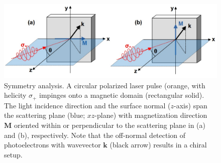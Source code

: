 \documentclass[prl,twocolumn,floatfix]{revtex4-2}
\renewcommand{\vec}[1]{\boldsymbol{#1}}
\newcommand{\rework}[1]{{\color{blue}{#1}}}
\begin{document}
\begin{figure}
    \centering
    \includegraphics[width = \columnwidth]{symmetry}
    \caption{Symmetry analysis. A circular polarized laser pulse (orange, with helicity $\sigma_{+}$ impinges onto a magnetic domain (rectangular solid). The light incidence direction and the surface normal ($z$-axis) span the scattering plane (blue; $xz$-plane) with magnetization direction $\vec{M}$ oriented within or perpendicular to the scattering plane in (a) and (b), respectively. Note that the off-normal detection of photoelectrons with wavevector $\vec{k}$ (black arrow) results in a chiral setup. 
    }
    \label{fig:symmetry}
\end{figure}
\end{document}

